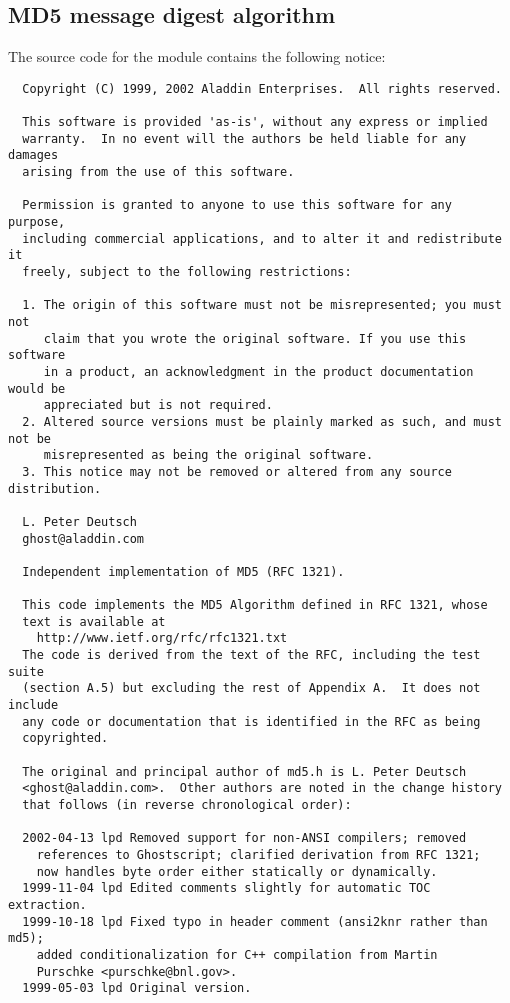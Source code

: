 \subsection{MD5 message digest algorithm}

The source code for the  module contains the following notice:

\begin{verbatim}
  Copyright (C) 1999, 2002 Aladdin Enterprises.  All rights reserved.

  This software is provided 'as-is', without any express or implied
  warranty.  In no event will the authors be held liable for any damages
  arising from the use of this software.

  Permission is granted to anyone to use this software for any purpose,
  including commercial applications, and to alter it and redistribute it
  freely, subject to the following restrictions:

  1. The origin of this software must not be misrepresented; you must not
     claim that you wrote the original software. If you use this software
     in a product, an acknowledgment in the product documentation would be
     appreciated but is not required.
  2. Altered source versions must be plainly marked as such, and must not be
     misrepresented as being the original software.
  3. This notice may not be removed or altered from any source distribution.

  L. Peter Deutsch
  ghost@aladdin.com

  Independent implementation of MD5 (RFC 1321).

  This code implements the MD5 Algorithm defined in RFC 1321, whose
  text is available at
	http://www.ietf.org/rfc/rfc1321.txt
  The code is derived from the text of the RFC, including the test suite
  (section A.5) but excluding the rest of Appendix A.  It does not include
  any code or documentation that is identified in the RFC as being
  copyrighted.

  The original and principal author of md5.h is L. Peter Deutsch
  <ghost@aladdin.com>.  Other authors are noted in the change history
  that follows (in reverse chronological order):

  2002-04-13 lpd Removed support for non-ANSI compilers; removed
	references to Ghostscript; clarified derivation from RFC 1321;
	now handles byte order either statically or dynamically.
  1999-11-04 lpd Edited comments slightly for automatic TOC extraction.
  1999-10-18 lpd Fixed typo in header comment (ansi2knr rather than md5);
	added conditionalization for C++ compilation from Martin
	Purschke <purschke@bnl.gov>.
  1999-05-03 lpd Original version.
\end{verbatim}



